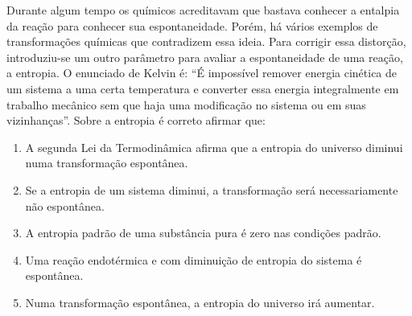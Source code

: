 Durante algum tempo os químicos acreditavam que bastava conhecer a entalpia da reação para conhecer sua espontaneidade. Porém, há vários exemplos de transformações químicas que contradizem essa ideia. Para corrigir essa distorção, introduziu-se um outro parâmetro para avaliar a espontaneidade de uma reação, a entropia. 
O enunciado de Kelvin é:
“É impossível remover energia cinética de um sistema a uma certa temperatura e converter essa energia integralmente em trabalho mecânico sem que haja uma modificação no sistema ou em suas vizinhanças”. 
Sobre a entropia é correto afirmar que:

\begin{enumerate}[label = (\alph*)]
	\item A segunda Lei da Termodinâmica afirma que a entropia do universo diminui numa transformação espontânea. 
	\item Se a entropia de um sistema diminui, a transformação será necessariamente não espontânea.
	\item A entropia padrão de uma substância pura é zero nas condições padrão.
	\item Uma reação endotérmica e com diminuição de entropia do sistema é espontânea. 
	\item Numa transformação espontânea, a entropia do universo irá aumentar.
\end{enumerate}
